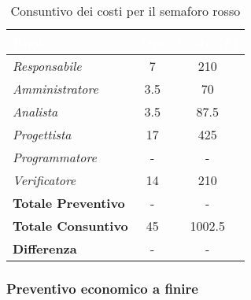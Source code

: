 \begin{table}[H]
    \renewcommand\arraystretch{1.5}
    \centering
    \begin{tabular}{|l|c|c|}
    \hline
    \rowcolor[HTML]{036400}
    \textcolor{white}{\textbf{Ruolo}} & \multicolumn{1}{l|}{\textcolor{white}{\textbf{Ore}}} & \multicolumn{1}{l|}{\textcolor{white}{\textbf{Costo (€)}}} \\ \hline
    \rowcolor[HTML]{EFEFEF}\textit{Responsabile}      & 7            & 210                 \\ \hline
    \rowcolor[HTML]{C0C0C0}\textit{Amministratore}    & 3.5          & 70                 \\ \hline
    \rowcolor[HTML]{EFEFEF}\textit{Analista}          & 3.5          & 87.5                 \\ \hline
    \rowcolor[HTML]{C0C0C0}\textit{Progettista}       & 17           & 425                 \\ \hline
    \rowcolor[HTML]{EFEFEF}\textit{Programmatore}     & -            & -                 \\ \hline
    \rowcolor[HTML]{C0C0C0}\textit{Verificatore}      & 14           & 210                 \\ \hline
    \rowcolor[HTML]{EFEFEF}\textbf{Totale Preventivo} & -            & -                \\ \hline
    \rowcolor[HTML]{C0C0C0}\textbf{Totale Consuntivo} & 45           & 1002.5            \\ \hline
    \rowcolor[HTML]{EFEFEF}\textbf{Differenza}        & -            & -                \\ \hline
    \end{tabular}
    \caption{Consuntivo dei costi per il semaforo rosso}
\end{table}

\subsubsection{Preventivo economico a finire}

